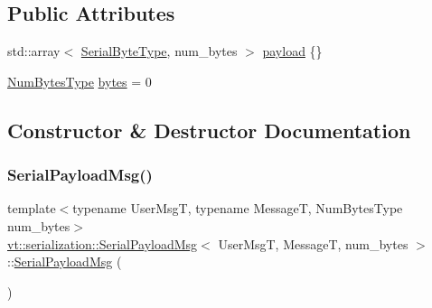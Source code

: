 \subsection*{Public Attributes}
\begin{DoxyCompactItemize}
\item 
std\+::array$<$ \hyperlink{namespacevt_ad48e08beb69a7f184fb1fdb4b7044174}{Serial\+Byte\+Type}, num\+\_\+bytes $>$ \hyperlink{structvt_1_1serialization_1_1_serial_payload_msg_ab71d301de848ba00a812bfaf3a0cc44e}{payload} \{\}
\item 
\hyperlink{namespacevt_1_1serialization_aaa03b9b407ed5776043c163629312e40}{Num\+Bytes\+Type} \hyperlink{structvt_1_1serialization_1_1_serial_payload_msg_ac9022dd53be215aeca6b300f84834806}{bytes} = 0
\end{DoxyCompactItemize}


\subsection{Constructor \& Destructor Documentation}
\mbox{\label{structvt_1_1serialization_1_1_serial_payload_msg_ace671323292af96db63162020c968bc8}} 
\subsubsection{\texorpdfstring{Serial\+Payload\+Msg()}{SerialPayloadMsg()}\hspace{0.1cm}{\footnotesize\ttfamily [1/3]}}
{\footnotesize\ttfamily template$<$typename User\+MsgT, typename MessageT, Num\+Bytes\+Type num\+\_\+bytes$>$ \\
\hyperlink{structvt_1_1serialization_1_1_serial_payload_msg}{vt\+::serialization\+::\+Serial\+Payload\+Msg}$<$ User\+MsgT, MessageT, num\+\_\+bytes $>$\+::\hyperlink{structvt_1_1serialization_1_1_serial_payload_msg}{Serial\+Payload\+Msg} (\begin{DoxyParamCaption}{ }\end{DoxyParamCaption})\hspace{0.3cm}{\ttfamily [inline]}}

\mbox{\label{structvt_1_1serialization_1_1_serial_payload_msg_a8e63da32454ab38b811cbeff74bb900d}} 
